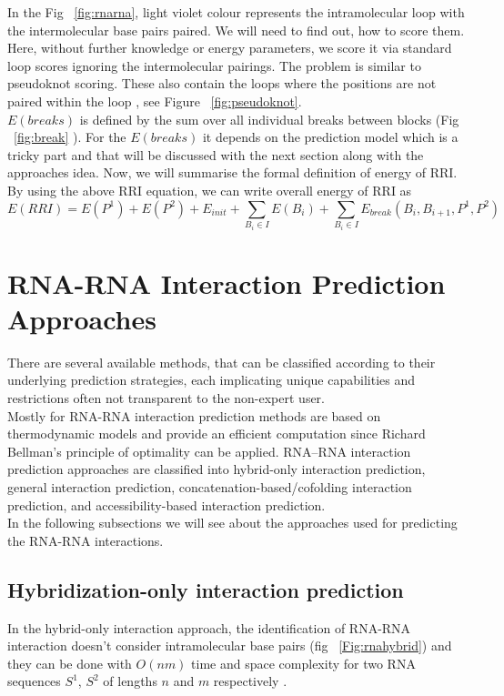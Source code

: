 \documentclass[twoside,a4paper]{report}
\numberwithin{equation}{section}
\begin{document}
	In the Fig ~\ref{fig:rnarna}, light violet colour represents the intramolecular loop with the intermolecular base pairs paired. We will need to find out, how to score them. Here, without further knowledge or energy parameters, we score it via standard loop scores ignoring the intermolecular pairings. The problem is similar to pseudoknot scoring. These also contain  the loops where the positions are not paired within the loop , see Figure ~\ref{fig:pseudoknot}.\\

	$E(breaks)$ is defined by the sum over all individual breaks between blocks (Fig  ~\ref{fig:break} ). For the $E(breaks)$ it depends on the prediction model which is a tricky part and that will be discussed with the next section along with the approaches idea. Now, we will summarise the formal definition of energy of RRI. By using the above RRI equation, we can write overall energy of RRI as \\
	
	\begin{equation}
	\label{eq:rri}
	E(RRI) = E(P^1)+E(P^2)+E_{init}+ \sum_{B_i \in I}E(B_i) + \sum_{B_i \in I} E_{break} (B_i,B_{i+1}, P^1, P^2)
	\end{equation}
	
	
	\section{RNA-RNA Interaction Prediction Approaches}
	There are several available methods, that can be classified according to their underlying prediction strategies, each implicating unique capabilities and restrictions often not transparent to the non-expert user.\\ 
	Mostly for RNA-RNA interaction prediction methods are based on thermodynamic models and provide an efficient computation since Richard Bellman’s principle of optimality \citep{raden2018interactive} can be applied. RNA–RNA interaction prediction approaches are classified into hybrid-only interaction prediction, general interaction prediction, concatenation-based/cofolding interaction prediction, and accessibility-based interaction prediction. \\
	
	In the following subsections we will see about the approaches used for predicting the RNA-RNA interactions.\\

	
	\subsection{Hybridization-only interaction prediction}
	In the hybrid-only interaction approach, the identification of RNA-RNA interaction doesn't consider intramolecular base pairs (fig ~\ref{Fig:rnahybrid}) and they can be done with $O(nm)$ time and space complexity for two RNA sequences $S^1$, $S^2$ of lengths $n$ and $m$ respectively \citep{tjaden2006target}.\\
	
\end{document}
